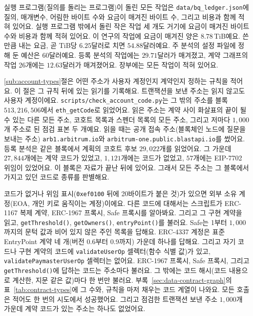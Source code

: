 실행 프로그램(질의를 돌리는 프로그램)이 돌린 모든 작업은 \texttt{data/bq\_ledger.json}에 질의, 매개변수, 어림한 바이트 수와 요금이 매겨진 바이트 수, 그리고 비용과 함께 적혀 있어요. 실행 프로그램 밖에서 돌린 작은 작업 세 개도 거기에 요금이 매겨진 바이트 수와 비용과 함께 적혀 있어요. 이 연구의 작업에 요금이 매겨진 양은 $8.78$\,TiB예요. 쓴 만큼 내는 요금, 곧 TiB당 $6.25$달러로 치면 $54.88$달러예요. 주 분석의 설정 파일에 정해 둔 예산은 $60$달러예요. 등록 분석의 작업에는 $29.71$달러가 매겨졌고, 계약 그래프의 작업 26개에는 $12.63$달러가 매겨졌어요. 장부에는 모든 작업이 적혀 있어요.


\ref{sub:account-types}절은 어떤 주소가 사용자 계정인지 계약인지 정하는 규칙을 적어요. 이 절은 그 규칙 뒤에 있는 읽기를 기록해요. 트랜잭션을 보낸 주소는 읽지 않고도 사용자 계정이에요. \texttt{scripts/check\_account\_code.py}는 그 밖의 주소를 블록 $513{,}216{,}506$에서 \texttt{eth\_getCode}로 읽었어요. 읽은 주소는 계약 사이 화살표의 끝이 될 수 있는 다른 모든 주소, 코호트 목록과 스펜더 목록의 모든 주소, 그리고 저마다 $1{,}000$개 주소로 된 점검 표본 두 개예요. 읽을 때는 공개 접속 주소(블록체인 노드에 질문을 보내는 주소) \texttt{arb1.arbitrum.io}와 \texttt{arbitrum-one.public.blastapi.io}를 썼어요. 등록 분석은 같은 블록에서 계획의 코호트 후보 $29{,}022$개를 읽었어요. 그 가운데 $27{,}844$개에는 계약 코드가 있었고, $1{,}121$개에는 코드가 없었고, $57$개에는 EIP-7702 위임이 있었어요. 이 블록은 자료가 끝난 뒤에 있어요. 그래서 모든 주소는 그 블록에서 가지고 있던 코드로 종류를 판별해요.

코드가 없거나 위임 표시(\texttt{0xef0100} 뒤에 20바이트가 붙은 것)가 있으면 외부 소유 계정(EOA, 개인 키로 움직이는 계정)이에요. 다른 코드에 대해서는 스크립트가 ERC-1167 복제 계약\parencite{murray2018erc1167}, ERC-1967 프록시\parencite{palladino2019erc1967}, Safe 프록시\parencite{safenddocs}를 알아봐요. 그리고 그 구현 계약을 읽고, \texttt{getThreshold()}, \texttt{getOwners()}, \texttt{entryPoint()}를 불러요. Safe는 1부터 $1{,}000$까지의 문턱 값과 비어 있지 않은 주인 목록을 답해요. ERC-4337 계정\parencite{buterin2021erc4337}은 표준 EntryPoint 계약 네 개(버전 0.6부터 0.9까지) 가운데 하나를 답해요. 그리고 자기 코드나 구현 계약의 코드에 \texttt{validateUserOp} 셀렉터(함수 식별 값)가 있고, \texttt{validatePaymasterUserOp} 셀렉터는 없어요. ERC-1967 프록시, Safe 프록시, 그리고 \texttt{getThreshold()}에 답하는 코드는 주소마다 불러요. 그 밖에는 코드 해시(코드 내용으로 계산한, 지문 같은 값)마다 한 번만 불러요. 부록~\ref{sec:data-contract-graph}의 표~\ref{tab:contract-types}에 그 수와, 규칙을 마저 채우는 코드 계열이 나와요. 모든 호출은 적어도 한 번의 시도에서 성공했어요. 그리고 점검한 트랜잭션 보낸 주소 $1{,}000$개 가운데 계약 코드가 있는 주소는 하나도 없었어요.

